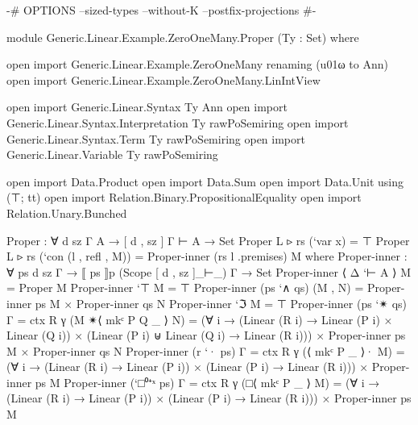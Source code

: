 \begin{code}
{-# OPTIONS --sized-types --without-K --postfix-projections #-}

module Generic.Linear.Example.ZeroOneMany.Proper (Ty : Set) where

  open import Generic.Linear.Example.ZeroOneMany renaming (u01ω to Ann)
  open import Generic.Linear.Example.ZeroOneMany.LinIntView

  open import Generic.Linear.Syntax Ty Ann
  open import Generic.Linear.Syntax.Interpretation Ty rawPoSemiring
  open import Generic.Linear.Syntax.Term Ty rawPoSemiring
  open import Generic.Linear.Variable Ty rawPoSemiring

  open import Data.Product
  open import Data.Sum
  open import Data.Unit using (⊤; tt)
  open import Relation.Binary.PropositionalEquality
  open import Relation.Unary.Bunched

  Proper : ∀ {d sz Γ A} → [ d , sz ] Γ ⊢ A → Set
  Proper {L ▹ rs} (`var x) = ⊤
  Proper {L ▹ rs} (`con (l , refl , M)) = Proper-inner (rs l .premises) M
    where
    Proper-inner : ∀ ps {d sz Γ} → ⟦ ps ⟧p (Scope [ d , sz ]_⊢_) Γ → Set
    Proper-inner ⟨ Δ `⊢ A ⟩ M = Proper M
    Proper-inner `⊤ M = ⊤
    Proper-inner (ps `∧ qs) (M , N) = Proper-inner ps M × Proper-inner qs N
    Proper-inner `ℑ M = ⊤
    Proper-inner (ps `✴ qs) {Γ = ctx R γ} (M ✴⟨ mkᶜ {P} {Q} _ ⟩ N) =
      (∀ i →
        (Linear (R i) → Linear (P i) × Linear (Q i)) ×
        (Linear (P i) ⊎ Linear (Q i) → Linear (R i)))
      × Proper-inner ps M × Proper-inner qs N
    Proper-inner (r `· ps) {Γ = ctx R γ} (⟨ mkᶜ {P} _ ⟩· M) =
      (∀ i → (Linear (R i) → Linear (P i)) × (Linear (P i) → Linear (R i)))
      × Proper-inner ps M
    Proper-inner (`□⁰⁺ˣ ps) {Γ = ctx R γ} (□⟨ mkᶜ {P} _ ⟩ M) =
      (∀ i → (Linear (R i) → Linear (P i)) × (Linear (P i) → Linear (R i)))
      × Proper-inner ps M
\end{code}
